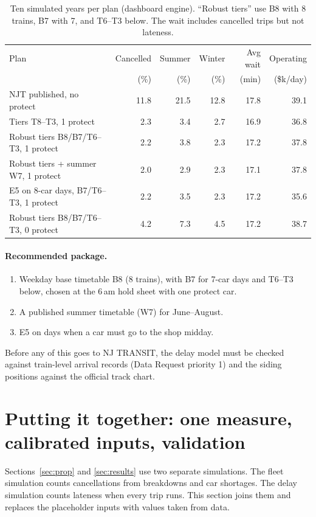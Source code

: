 \documentclass[11pt]{article}
\begin{document}
\begin{table}[ht]\centering\small
\begin{tabular}{@{}lrrrrr@{}}
\toprule
Plan & Cancelled & Summer & Winter & Avg wait & Operating \\
 & (\%) & (\%) & (\%) & (min) & (\$k/day) \\
\midrule
NJT published, no protect & 11.8 & 21.5 & 12.8 & 17.8 & 39.1 \\
Tiers T8--T3, 1 protect & 2.3 & 3.4 & 2.7 & 16.9 & 36.8 \\
Robust tiers B8/B7/T6--T3, 1 protect & 2.2 & 3.8 & 2.3 & 17.2 & 37.8 \\
Robust tiers + summer W7, 1 protect & 2.0 & 2.9 & 2.3 & 17.1 & 37.8 \\
E5 on 8-car days, B7/T6--T3, 1 protect & 2.2 & 3.5 & 2.3 & 17.2 & 35.6 \\
Robust tiers B8/B7/T6--T3, 0 protect & 4.2 & 7.3 & 4.5 & 17.2 & 38.7 \\
\bottomrule
\end{tabular}
\caption{Ten simulated years per plan (dashboard engine). ``Robust tiers'' use B8 with 8 trains, B7 with 7, and T6--T3 below. The wait includes cancelled trips but not lateness.}\label{tab:propyear}
\end{table}

\paragraph{Recommended package.}
\begin{enumerate}
\item Weekday base timetable B8 (8 trains), with B7 for 7-car days and T6--T3 below, chosen at the 6\,am hold sheet with one protect car.
\item A published summer timetable (W7) for June--August.
\item E5 on days when a car must go to the shop midday.
\end{enumerate}
Before any of this goes to NJ TRANSIT, the delay model must be checked against train-level arrival records (Data Request priority 1) and the siding positions against the official track chart.

\clearpage
\section{Putting it together: one measure, calibrated inputs, validation}\label{sec:combined}
Sections~\ref{sec:prop} and \ref{sec:results} use two separate simulations. The fleet simulation counts cancellations from breakdowns and car shortages. The delay simulation counts lateness when every trip runs. This section joins them and replaces the placeholder inputs with values taken from data.
\end{document}

